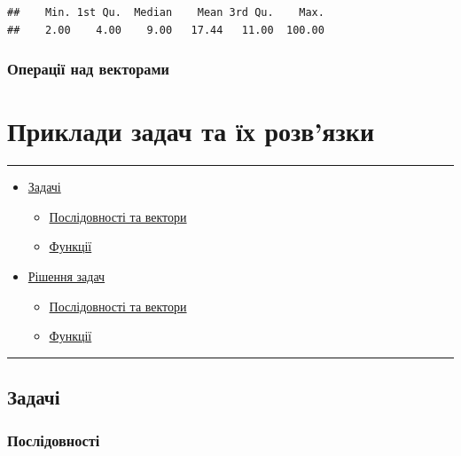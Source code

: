 \documentclass[
]{book}
\providecommand{\tightlist}{%
  \setlength{\itemsep}{0pt}\setlength{\parskip}{0pt}}
\begin{document}
\begin{verbatim}
##    Min. 1st Qu.  Median    Mean 3rd Qu.    Max. 
##    2.00    4.00    9.00   17.44   11.00  100.00
\end{verbatim}

\hypertarget{chapter323}{%
\subsection{Операції над векторами}\label{chapter323}}

\hypertarget{chapter6}{%
\chapter{Приклади задач та їх розв'язки}\label{chapter6}}

\begin{center}\rule{0.5\linewidth}{0.5pt}\end{center}

\begin{itemize}
\tightlist
\item
  \protect\hyperlink{chapter61}{Задачі}

  \begin{itemize}
  \tightlist
  \item
    \protect\hyperlink{chapter611}{Послідовності та вектори}
  \item
    \protect\hyperlink{chapter612}{Функції}
  \end{itemize}
\item
  \protect\hyperlink{chapter62}{Рішення задач}

  \begin{itemize}
  \tightlist
  \item
    \protect\hyperlink{chapter621}{Послідовності та вектори}
  \item
    \protect\hyperlink{chapter622}{Функції}
  \end{itemize}
\end{itemize}

\begin{center}\rule{0.5\linewidth}{0.5pt}\end{center}

\hypertarget{chapter61}{%
\section{Задачі}\label{chapter61}}

\hypertarget{chapter611}{%
\subsection{Послідовності}\label{chapter611}}
\end{document}

